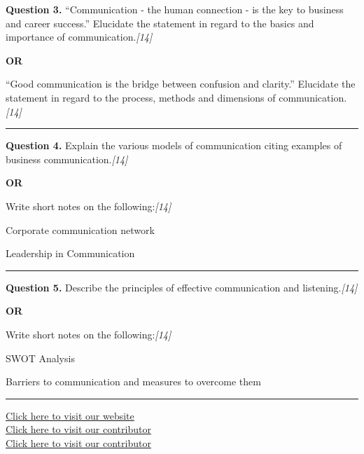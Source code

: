\documentclass[11pt,a4paper]{article}
\newcommand{\pts}[1]{\hfill   \textit{[#1]}}
\begin{document}
\noindent   \textbf{Question 3.}
``Communication - the human connection - is the key to business and career success.'' Elucidate the statement in regard to the basics and importance of communication.\pts{14}

\centerline{   \textbf{OR}}

``Good communication is the bridge between confusion and clarity.'' Elucidate the statement in regard to the process, methods and dimensions of communication.\pts{14}

\medskip\rule{\linewidth}{0.2pt}




\noindent   \textbf{Question 4.}
Explain the various models of communication citing examples of business communication.\pts{14}

\centerline{   \textbf{OR}}

Write short notes on the following:\pts{14}

\begin{parts}
  \item Corporate communication network
  \item Leadership in Communication
\end{parts}

\medskip\rule{\linewidth}{0.2pt}




\noindent   \textbf{Question 5.}
Describe the principles of effective communication and listening.\pts{14}

\centerline{   \textbf{OR}}

Write short notes on the following:\pts{14}

\begin{parts}
  \item SWOT Analysis
  \item Barriers to communication and measures to overcome them
\end{parts}

\vfill
\rule{\linewidth}{0.4pt}

\begin{center}\small
\href{https://bhu-exam.vercel.app/}{Click here to visit our website}\\[4pt]
\href{https://me-aryan.vercel.app/}{Click here to visit our contributor}\\[4pt]
\href{https://quashan-me.vercel.app/}{Click here to visit our contributor}
\end{center}
\end{document}
